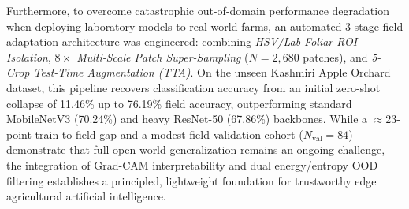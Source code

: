 \documentclass[conference]{IEEEtran}
\begin{document}
Furthermore, to overcome catastrophic out-of-domain performance degradation when deploying laboratory models to real-world farms, an automated 3-stage field adaptation architecture was engineered: combining \textit{HSV/Lab Foliar ROI Isolation}, \textit{$8\times$ Multi-Scale Patch Super-Sampling} ($N = 2,680$ patches), and \textit{5-Crop Test-Time Augmentation (TTA)}. On the unseen Kashmiri Apple Orchard dataset, this pipeline recovers classification accuracy from an initial zero-shot collapse of 11.46\% up to 76.19\% field accuracy, outperforming standard MobileNetV3 (70.24\%) and heavy ResNet-50 (67.86\%) backbones. While a $\approx 23$-point train-to-field gap and a modest field validation cohort ($N_{\text{val}}=84$) demonstrate that full open-world generalization remains an ongoing challenge, the integration of Grad-CAM interpretability and dual energy/entropy OOD filtering establishes a principled, lightweight foundation for trustworthy edge agricultural artificial intelligence.
\end{document}
